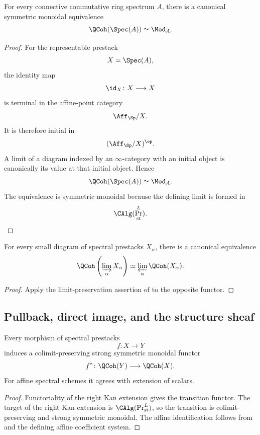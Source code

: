 \begin{corollary}
\label{cor:qcoh-recovery-affines}
For every connective commutative ring spectrum $A$, there is a canonical
symmetric monoidal equivalence
\[
    \QCoh(\Spec(A))
    \simeq
    \Mod_A.
\]
\end{corollary}\begin{proof}
For the representable prestack
\[
    X=\Spec(A),
\]
the identity map
\[
    \id_X
    \colon
    X
    \longrightarrow
    X
\]
is terminal in the affine-point category
\[
    \Aff_{\Sp}/X.
\]
It is therefore initial in
\[
    (\Aff_{\Sp}/X)^{\op}.
\]
A limit of a diagram indexed by an $\infty$-category with an initial
object is canonically its value at that initial object. Hence
\[
    \QCoh(\Spec(A))
    \simeq
    \Mod_A.
\]
The equivalence is symmetric monoidal because the defining limit is
formed in
\[
    \CAlg(\Pr^L_{\mathrm{st}}).
\]
\end{proof}

\begin{corollary}
\label{cor:qcoh-colimits-to-limits}
For every small diagram of spectral prestacks $X_\alpha$, there is a
canonical equivalence
\[
    \QCoh
    \left(
        \varinjlim_\alpha X_\alpha
    \right)
    \simeq
    \varprojlim_\alpha\QCoh(X_\alpha).
\]
\end{corollary}

\begin{proof}
Apply the limit-preservation assertion of
 to the opposite functor.
\end{proof}

\subsection{Pullback, direct image, and the structure sheaf}

\begin{proposition}
\label{prop:qcoh-pullback}
Every morphism of spectral prestacks
\[
    f
    \colon
    X
    \longrightarrow
    Y
\]
induces a colimit-preserving strong symmetric monoidal functor
\[
    f^*
    \colon
    \QCoh(Y)
    \longrightarrow
    \QCoh(X).
\]
For affine spectral schemes it agrees with extension of scalars.
\end{proposition}

\begin{proof}
Functoriality of the right Kan extension gives the transition functor.
The target of the right Kan extension is
$\CAlg(\Pr^L_{\mathrm{st}})$, so the transition is colimit-preserving and
strong symmetric monoidal. The affine identification follows from
 and the defining affine coefficient
system.
\end{proof}


